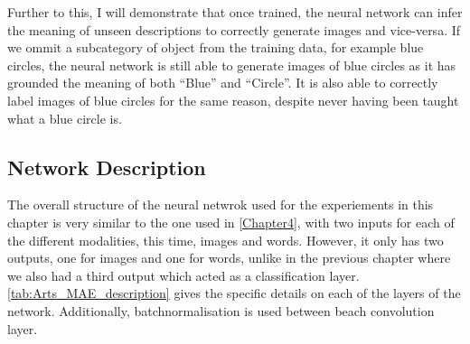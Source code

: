 Further to this, I will demonstrate that once trained, the neural network can infer the meaning of unseen descriptions to correctly generate images and vice-versa. If we ommit a subcategory of object from the training data, for example blue circles, the neural network is still able to generate images of blue circles as it has grounded the meaning of both ``Blue'' and ``Circle''. It is also able to correctly label images of blue circles for the same reason, despite never having been taught what a blue circle is.


\subsection{Network Description}
The overall structure of the neural netwrok used for the experiements in this chapter is very similar to the one used in \autoref{Chapter4}, with two inputs for each of the different modalities, this time, images and words. However, it only has two outputs, one for images and one for words, unlike in the previous chapter where we also had a third output which acted as a classification layer. \autoref{tab:Arts_MAE_description} gives the specific details on each of the layers of the network. Additionally, batchnormalisation is used between beach convolution layer.

